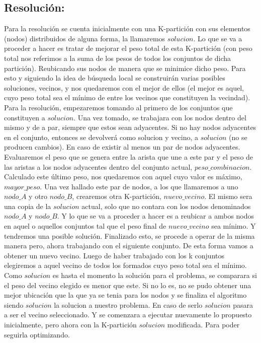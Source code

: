\documentclass[a4paper]{article}
\begin{document}
\subsection{Resoluci\'on:}

Para la resoluci\'on se cuenta inicialmente con una K-partici\'on con sus elementos (nodos) distribuidos de alguna forma, la llamaremos $solucion$. Lo que se va a proceder a hacer es tratar de mejorar el peso total de esta K-partici\'on (con peso total nos referimos a la suma de los pesos de todos los conjuntos de dicha partici\'on). Reubicando sus nodos de manera que se minimice dicho peso.
Para esto y siguiendo la idea de b\'usqueda local se construir\'an varias posibles soluciones, vecinos, y nos quedaremos con el mejor de ellos (el mejor es aquel, cuyo peso total sea el m\'inimo de entre los vecinos que constituyen la vecindad).  
Para la resoluci\'on, empezaremos tomando al primero de los conjuntos  que constituyen a $solucion$. Una vez tomado, se trabajara con los nodos dentro del mismo y de a par, siempre que estos sean adyacentes. Si no hay nodos adyacentes en el conjunto, entonces se devolver\'a como solucion y vecino, a $solucion$ (no se producen cambios). En caso de existir al menos un  par de nodos adyacentes. Evaluaremos el peso que se genera entre la arista que une a este par y el peso de las aristas a los nodos adyacentes dentro del conjunto actual, $peso\_combinacion$. Calculado este \'ultimo peso, nos quedaremos con aquel cuyo valor es m\'aximo, $mayor\_peso$. Una vez hallado este par de nodos, a los que llamaremos a uno $nodo\_A$ y otro $nodo\_B$, crearemos otra K-partici\'on, $nuevo\_vecino$. El mismo sera una copia de la $solucion$ actual, solo que no contara con los nodos denominados $nodo\_A$ y $nodo\_B$.  Y lo que se va a proceder a hacer es a reubicar a ambos nodos en aquel o aquellos conjuntos tal que el peso final de $nuevo\_vecino$ sea m\'inimo. Y tendremos una posible soluci\'on. Finalizado esto, se procede a operar de la misma manera pero, ahora trabajando con el siguiente conjunto. De esta forma vamos a obtener un nuevo vecino. Luego de haber trabajado con los k conjuntos elegiremos a aquel vecino de todos los formados cuyo peso total sea el m\'inimo. Como $solucion$ es hasta el momento la soluci\'on para el problema, se comparara si el peso del vecino elegido es menor que este. Si no lo es, no se pudo obtener una mejor ubicaci\'on  que la que ya se tenia para los nodos y se finaliza el algoritmo siendo $solucion$ la solucion a nuestro problema. En caso de serlo $solucion$ pasara a ser el vecino seleccionado. Y se comenzara a ejecutar nuevamente lo propuesto inicialmente, pero ahora con la K-partici\'on $solucion$ modificada. Para poder seguirla optimizando.
\end{document}
